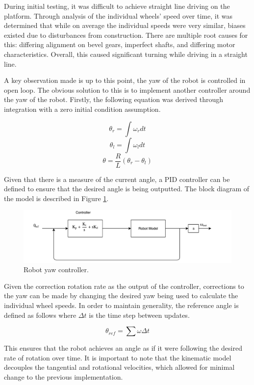 \documentclass[ece]{uw-wkrpt}
\begin{document}
During initial testing, it was difficult to achieve straight line driving on the platform. Through analysis of the individual wheels' speed over time, it was determined that while on average the individual speeds were very similar, biases existed due to disturbances from construction. There are multiple root causes for this: differing alignment on bevel gears, imperfect shafts, and differing motor characteristics. Overall, this caused significant turning while driving in a straight line.

A key observation made is up to this point, the yaw of the robot is controlled in open loop. The obvious solution to this is to implement another controller around the yaw of the robot. Firstly, the following equation was derived through integration with a zero initial condition assumption.

\[\theta_r = \int\omega_rdt\]
\[\theta_l = \int\omega_ldt\]
\[\theta=\frac{R}{L}(\theta_r-\theta_l)\]

Given that there is a measure of the current angle, a PID controller can be defined to ensure that the desired angle is being outputted. The block diagram of the model is described in Figure \ref{fig:yawController}.

\begin{figure}
    \centering
    \includegraphics[width=5.5in]{res/yawController}
    \caption[Robot yaw controller]
          {Robot yaw controller.}
    \label{fig:yawController}
\end{figure}

Given the correction rotation rate as the output of the controller, corrections to the yaw can be made by changing the desired yaw being used to calculate the individual wheel speeds. In order to maintain generality, the reference angle is defined as follows where $\Delta t$ is the time step between updates. 

\[\theta_{ref} = \sum\omega \Delta t\]

This ensures that the robot achieves an angle as if it were following the desired rate of rotation over time. It is important to note that the kinematic model decouples the tangential and rotational velocities, which allowed for minimal change to the previous implementation. 
\end{document}
